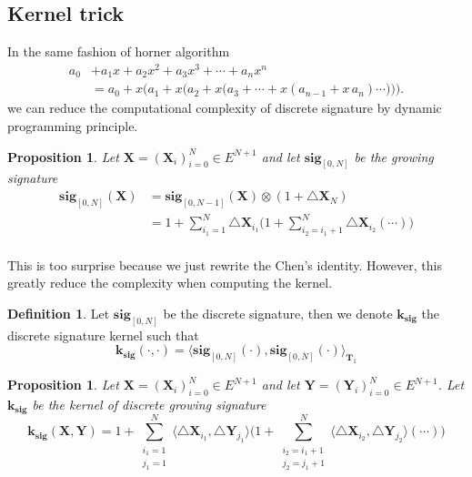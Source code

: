\documentclass[12pt]{report}
\newtheorem{proposition}[theorem]{Proposition}
\theoremstyle{definition}
\newtheorem{definition}[theorem]{Definition}
\theoremstyle{remark}
\begin{document}
  \subsection{Kernel trick}
  In the same fashion of horner algorithm 
  \begin{equation}
    \begin{aligned}a_{0}&+a_{1}x+a_{2}x^{2}+a_{3}x^{3}+\cdots +a_{n}x^{n}\\&=a_{0}+x{\bigg (}a_{1}+x{\Big (}a_{2}+x{\big (}a_{3}+\cdots +x(a_{n-1}+x\,a_{n})\cdots {\big )}{\Big )}{\bigg )}.\end{aligned}
  \end{equation}
  we can reduce the computational complexity of discrete signature by dynamic programming principle.
  \begin{proposition}Let $\mathbf{X} = (\mathbf{X}_{i})_{i=0}^{N} \in E^{N+1}$ and let $\mathbf{sig}_{[0,N]}$ be the growing signature
  \begin{equation}
    \begin{split}
      \mathbf{sig}_{[0,N]}(\mathbf{X}) &= \mathbf{sig}_{[0,N-1]}(\mathbf{X}) \otimes(1 + \triangle \mathbf{X}_{N})\\
      &= 1 + \sum_{i_{1} = 1}^{N}\triangle \mathbf{X}_{i_{1}}\Big(1 + \sum_{i_{2} = i_{1}+1}^{N}\triangle\mathbf{X}_{i_{2}}(\cdots)\Big)\\
    \end{split}
  \end{equation}
  \end{proposition}
  This is too surprise because we just rewrite the Chen's identity. However, this greatly reduce the complexity when computing the kernel. 
  \begin{definition} Let $\mathbf{sig}_{[0,N]}$ be the discrete signature, then we denote $\mathbf{k}_{\mathbf{sig}}$ the discrete signature kernel such that 
  \begin{equation}
    \mathbf{k}_{\mathbf{sig}}(\cdot,\cdot) = \langle \mathbf{sig}_{[0,N]}(\cdot),\mathbf{sig}_{[0,N]}(\cdot)\rangle_{\mathbf{T}_{1}}
  \end{equation}
  \end{definition}
  \begin{proposition}\label{recur1}
    Let $\mathbf{X} = (\mathbf{X}_{i})_{i=0}^{N} \in E^{N+1}$ and let $\mathbf{Y} = (\mathbf{Y}_{i})_{i=0}^{N} \in E^{N+1}$. Let $\mathbf{k}_{\mathbf{sig}}$ be the kernel of discrete growing signature
  \begin{equation}\label{kernel}
    \mathbf{k}_{\mathbf{sig}}(\mathbf{X},\mathbf{Y}) = 1 + \sum_{\substack{i_{1}=1 \\ j_{1} = 1}}^{N}\langle \triangle \mathbf{X}_{i_{1}},  \triangle \mathbf{Y}_{j_{1}} \rangle\Big(1 + \sum_{\substack{i_{2}=i_{1}+1 \\ j_{2} = j_{1}+1}}^{N}\langle \triangle \mathbf{X}_{i_{2}},  \triangle \mathbf{Y}_{j_{2}} \rangle(\cdots)\Big)
  \end{equation}
  \end{proposition}  
\end{document}
